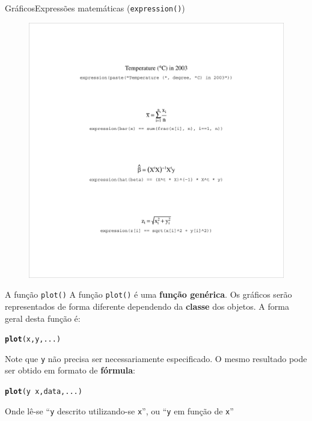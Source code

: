 \documentclass[10pt]{beamer}\usepackage[]{graphicx}\usepackage[]{color}
\makeatletter
\newcommand{\hlopt}[1]{\textcolor[rgb]{0,0,0}{#1}}%
\newcommand{\hlstd}[1]{\textcolor[rgb]{0.345,0.345,0.345}{#1}}%
\newcommand{\hlkwd}[1]{\textcolor[rgb]{0.737,0.353,0.396}{\textbf{#1}}}%
\newenvironment{kframe}{%
 \def\at@end@of@kframe{}%
 \ifinner\ifhmode%
  \def\at@end@of@kframe{\end{minipage}}%
  \begin{minipage}{\columnwidth}%
 \fi\fi%
 \def\FrameCommand##1{\hskip\@totalleftmargin \hskip-\fboxsep
 \colorbox{shadecolor}{##1}\hskip-\fboxsep
     \hskip-\linewidth \hskip-\@totalleftmargin \hskip\columnwidth}%
 \MakeFramed {\advance\hsize-\width
   \@totalleftmargin\z@ \linewidth\hsize
   \@setminipage}}%
 {\par\unskip\endMakeFramed%
 \at@end@of@kframe}
\newenvironment{knitrout}{}{} %
\makeatother
\begin{document}
\begin{frame}[fragile]{Gráficos}{Expressões matemáticas
    (\texttt{expression()})}
\begin{figure}[htp]
\centering
\includegraphics[height=0.95\textheight]{figure/fig7m}
\end{figure}
\end{frame}

\begin{frame}[fragile]{A função \texttt{plot()}}
A função \texttt{plot()} é uma \textbf{função genérica}. Os gráficos serão
representados de forma diferente dependendo da \textbf{classe} dos
objetos. A forma geral desta função é:
\begin{knitrout}\small
{}\color{fgcolor}\begin{kframe}
\begin{alltt}
\hlkwd{plot}\hlstd{(x, y, ...)}
\end{alltt}
\end{kframe}
\end{knitrout}
Note que \texttt{y} não precisa ser necessariamente especificado. O
mesmo resultado pode ser obtido em formato de \textbf{fórmula}:
\begin{knitrout}\small
{}\color{fgcolor}\begin{kframe}
\begin{alltt}
\hlkwd{plot}\hlstd{(y} \hlopt{~} \hlstd{x, data, ...)}
\end{alltt}
\end{kframe}
\end{knitrout}
Onde lê-se ``\texttt{y} descrito utilizando-se \texttt{x}'', ou
``\texttt{y} em função de \texttt{x}''
\end{frame}
\end{document}
